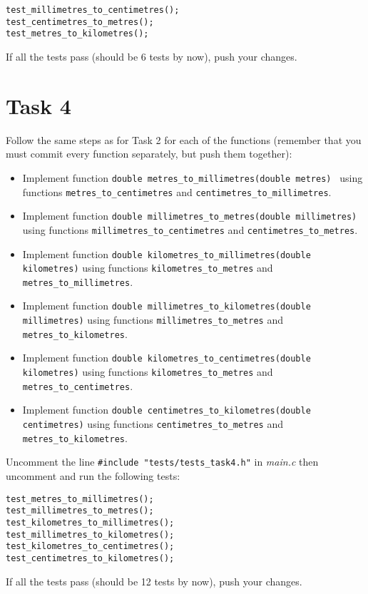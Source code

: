 \documentclass{article}
\begin{document}
\begin{lstlisting}
test_millimetres_to_centimetres();
test_centimetres_to_metres();
test_metres_to_kilometres();
\end{lstlisting}

If all the tests pass (should be 6 tests by now), push your changes.

\section*{Task 4}

Follow the same steps as for Task 2 for each of the functions (remember that you must commit every function separately, but push them together):

\begin{itemize}
\item Implement function \lstinline{double metres_to_millimetres(double metres) } using functions \lstinline{metres_to_centimetres} and \lstinline{centimetres_to_millimetres}.
\item Implement function \lstinline{double millimetres_to_metres(double millimetres)} using functions \lstinline{millimetres_to_centimetres} and \lstinline{centimetres_to_metres}.
\item Implement function \lstinline{double kilometres_to_millimetres(double kilometres)} using functions \lstinline{kilometres_to_metres} and \lstinline{metres_to_millimetres}.
\item Implement function \lstinline{double millimetres_to_kilometres(double millimetres)} using functions \lstinline{millimetres_to_metres} and \lstinline{metres_to_kilometres}.
\item Implement function \lstinline{double kilometres_to_centimetres(double kilometres)} using functions \lstinline{kilometres_to_metres} and \lstinline{metres_to_centimetres}.
\item Implement function \lstinline{double centimetres_to_kilometres(double centimetres)} using functions \lstinline{centimetres_to_metres} and \lstinline{metres_to_kilometres}.
\end{itemize}

Uncomment the line \lstinline{#include "tests/tests_task4.h"} in \emph{main.c} then uncomment and run the following tests:

\begin{lstlisting}
test_metres_to_millimetres();
test_millimetres_to_metres();
test_kilometres_to_millimetres();
test_millimetres_to_kilometres();
test_kilometres_to_centimetres();
test_centimetres_to_kilometres();
\end{lstlisting}

If all the tests pass (should be 12 tests by now), push your changes.
\end{document}
